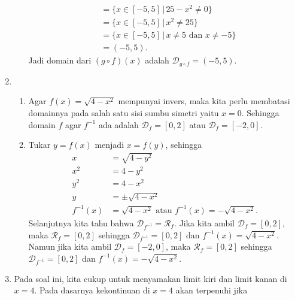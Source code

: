 \documentclass[11pt,openany,a4paper]{article}
\begin{document}
\begin{enumerate}
\begin{enumerate}
\begin{align*}
                                                & = \{x \in [-5,5] \,|\, 25 - x^2 \ne 0\}                       \\
                                                & = \{x \in [-5,5] \,|\, x^2 \ne 25\}                           \\
                                                & = \{x \in [-5,5] \,|\, x \ne 5\text{ dan } x \ne -5\}         \\
                                                & = (-5,5).
                    \end{align*}
                    Jadi domain dari $(g \circ f)(x)$ adalah $\mathcal{D}_{g \circ f} = (-5,5)$.
          \end{enumerate}
    \item \begin{enumerate}
              \item Agar $f(x) = \sqrt{4 - x^2}$ mempunyai invers, maka kita perlu membatasi domainnya pada salah satu sisi sumbu simetri yaitu $x=0$. Sehingga domain $f$ agar $f^{-1}$ ada adalah $\mathcal{D}_f = [0,2]$ atau $\mathcal{D}_f = [-2,0]$.
              \item Tukar $y = f(x)$ menjadi $x = f(y)$, sehingga
                    \begin{align*}
                        x         & = \sqrt{4 - y^2}                                            \\
                        x^2       & = 4 - y^2                                                   \\
                        y^2       & = 4 - x^2                                                   \\
                        y         & = \pm\sqrt{4 - x^2}                                         \\
                        f^{-1}(x) & = \sqrt{4 - x^2} \text{ atau } f^{-1}(x) = -\sqrt{4 - x^2}.
                    \end{align*}
                    Selanjutnya kita tahu bahwa $\mathcal{D}_{f^{-1}} = \mathcal{R}_f$. Jika kita ambil $\mathcal{D}_f = [0,2]$, maka $\mathcal{R}_f = [0,2]$ sehingga $\mathcal{D}_{f^{-1}} = [0,2]$ dan $f^{-1}(x) = \sqrt{4 - x^2}$.
                    Namun jika kita ambil $\mathcal{D}_f = [-2,0]$, maka $\mathcal{R}_f = [0,2]$ sehingga $\mathcal{D}_{f^{-1}} = [0,2]$ dan $f^{-1}(x) = -\sqrt{4 - x^2}$.
          \end{enumerate}
    \item Pada soal ini, kita cukup untuk menyamakan limit kiri dan limit kanan di $x=4$. Pada dasarnya kekontinuan di $x=4$ akan terpenuhi jika

\end{enumerate}
\end{document}
